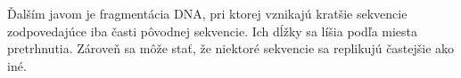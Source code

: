Ďalším javom je fragmentácia DNA, pri ktorej vznikajú kratšie sekvencie zodpovedajúce iba časti pôvodnej sekvencie.
Ich dĺžky sa líšia podľa miesta pretrhnutia.
Zároveň sa môže stať, že niektoré sekvencie sa replikujú častejšie ako iné.
